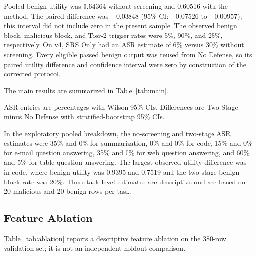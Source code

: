 \documentclass[conference,a4paper]{IEEEtran}
\begin{document}
Pooled benign utility was 0.64364 without screening and 0.60516 with the method. The paired difference was $-0.03848$ (95\% CI: $-0.07526$ to $-0.00957$); this interval did not include zero in the present sample. The observed benign block, malicious block, and Tier-2 trigger rates were 5\%, 90\%, and 25\%, respectively. On v4, SRS Only had an ASR estimate of 6\% versus 30\% without screening. Every eligible passed benign output was reused from No Defense, so its paired utility difference and confidence interval were zero by construction of the corrected protocol.

The main results are summarized in Table~\ref{tab:main}.

\begin{table}[t]
\caption{CORRECTED SHARED-RESPONSE RESULTS ACROSS LOCKED BIPIA HOLDOUTS}
\label{tab:main}
\centering
\scriptsize
\setlength{\tabcolsep}{2.5pt}
\vspace{2pt}

\parbox{0.98\columnwidth}{\scriptsize ASR entries are percentages with Wilson 95\% CIs. Differences are Two-Stage minus No Defense with stratified-bootstrap 95\% CIs.}
\end{table}

In the exploratory pooled breakdown, the no-screening and two-stage ASR estimates were 35\% and 0\% for summarization, 0\% and 0\% for code, 15\% and 0\% for e-mail question answering, 35\% and 0\% for web question answering, and 60\% and 5\% for table question answering. The largest observed utility difference was in code, where benign utility was 0.9395 and 0.7519 and the two-stage benign block rate was 20\%. These task-level estimates are descriptive and are based on 20 malicious and 20 benign rows per task.

\subsection{Feature Ablation}
Table~\ref{tab:ablation} reports a descriptive feature ablation on the 380-row validation set; it is not an independent holdout comparison.
\end{document}
